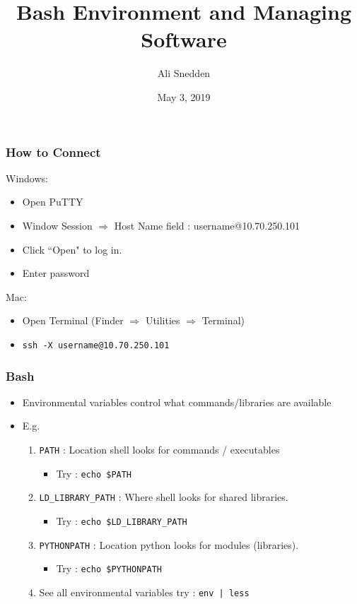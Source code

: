 \documentclass{beamer}
\title{Bash Environment and Managing Software}
\author{Ali Snedden}
\institute{Nationwide Children's Hospital}
\date{May 3, 2019}
\newcommand{\code}[1]{\colorbox{codegray}{\texttt{#1}}}
\begin{document}
 
\frame{\titlepage}




\begin{frame}
\frametitle{How to Connect}
Windows:
\begin{itemize}
    \item Open PuTTY
    \item Window Session $\Rightarrow$ Host Name field : username@10.70.250.101
    \item Click ``Open" to log in.
    \item Enter password
\end{itemize}

Mac:
\begin{itemize}
    \item Open Terminal (Finder $\Rightarrow$ Utilities $\Rightarrow$ Terminal)
    \item \code{ssh -X username@10.70.250.101}
\end{itemize}
\end{frame}



\begin{frame}
\frametitle{Bash}
\begin{itemize}
    \item Environmental variables control what commands/libraries are available
    \pause
    \item E.g.
    \pause
    \begin{enumerate}
        \item \code{PATH} : Location shell looks for commands / executables
            \begin{itemize}
                \item Try : \code{echo \$PATH}
            \end{itemize}
        \pause
        \bigskip
        \item \code{LD\_LIBRARY\_PATH} : Where shell looks for shared libraries.
            \begin{itemize}
                \item Try : \code{echo \$LD\_LIBRARY\_PATH}
            \end{itemize}
        \pause
        \bigskip
        \item \code{PYTHONPATH} : Location python looks for modules (libraries).
            \begin{itemize}
                \item Try : \code{echo \$PYTHONPATH}
            \end{itemize}
    \pause
    \bigskip
    \item See all environmental variables try : \code{env | less}
    \end{enumerate}
\end{itemize}
\end{frame}
\end{document}

